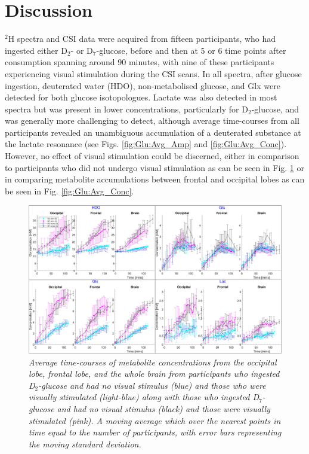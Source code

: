 \section{Discussion}

$^2$H spectra and \ac{CSI} data were acquired from fifteen participants, who had ingested either D$_2$- or D$_7$-glucose, before and then at 5 or 6 time points after consumption spanning around 90 minutes, with nine of these participants experiencing visual stimulation during the \ac{CSI} scans. In all spectra, after glucose ingestion, deuterated water (\ac{HDO}), non-metabolised glucose, and Glx were detected for both glucose isotopologues. Lactate was also detected in most spectra but was present in lower concentrations, particularly for D$_2$-glucose, and was generally more challenging to detect, although average time-courses from all participants revealed an unambiguous accumulation of a deuterated substance at the lactate resonance (see Figs. \ref{fig:Glu:Avg_Amp} and \ref{fig:Glu:Avg_Conc}). However, no effect of visual stimulation could be discerned, either in comparison to participants who did not undergo visual stimulation as can be seen in Fig. \ref{fig:Glu:Vis_Stim} or in comparing metabolite accumulations between frontal and occipital lobes as can be seen in Fig. \ref{fig:Glu:Avg_Conc}.

\begin{figure}
    \centering
    \includegraphics[width = 1\textwidth]{Figures/Glucose/Vis_Stim.png}
    \caption{\textit{Average time-courses of metabolite concentrations from the occipital lobe, frontal lobe, and the whole brain from participants who ingested D$_2$-glucose and had no visual stimulus (blue) and those who were visually stimulated (light-blue) along with those who ingested D$_7$-glucose and had no visual stimulus (black) and those were visually stimulated (pink). A moving average which over the nearest points in time equal to the number of participants, with error bars representing the moving standard deviation.}}
    \label{fig:Glu:Vis_Stim}
\end{figure}

